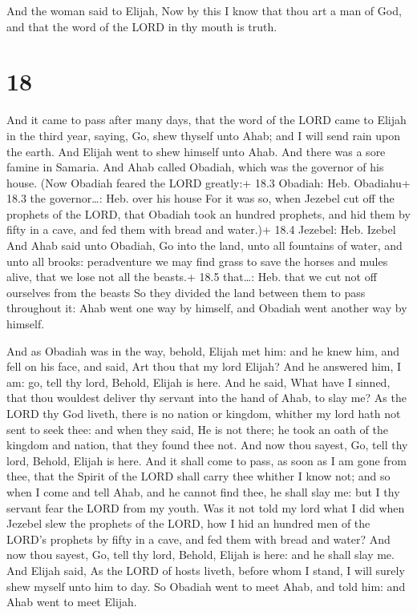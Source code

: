  And the woman said to Elijah, Now by this I know that
thou art a man of God, and that the word of the LORD in thy mouth is
truth.

\hypertarget{section-17}{%
\section{18}\label{section-17}}

 And it came to pass after many days, that the word of the
LORD came to Elijah in the third year, saying, Go, shew thyself unto
Ahab; and I will send rain upon the earth.  And Elijah went
to shew himself unto Ahab. And there was a sore famine in Samaria.
 And Ahab called Obadiah, which was the governor of his
house. (Now Obadiah feared the LORD greatly:+ 18.3 Obadiah: Heb.
Obadiahu+ 18.3 the governor\ldots: Heb. over his house  For
it was so, when Jezebel cut off the prophets of the LORD, that Obadiah
took an hundred prophets, and hid them by fifty in a cave, and fed them
with bread and water.)+ 18.4 Jezebel: Heb. Izebel  And Ahab
said unto Obadiah, Go into the land, unto all fountains of water, and
unto all brooks: peradventure we may find grass to save the horses and
mules alive, that we lose not all the beasts.+ 18.5 that\ldots: Heb.
that we cut not off ourselves from the beasts  So they
divided the land between them to pass throughout it: Ahab went one way
by himself, and Obadiah went another way by himself.

 And as Obadiah was in the way, behold, Elijah met him:
and he knew him, and fell on his face, and said, Art thou that my lord
Elijah?  And he answered him, I am: go, tell thy lord,
Behold, Elijah is here.  And he said, What have I sinned,
that thou wouldest deliver thy servant into the hand of Ahab, to slay
me?  As the LORD thy God liveth, there is no nation or
kingdom, whither my lord hath not sent to seek thee: and when they said,
He is not there; he took an oath of the kingdom and nation, that they
found thee not.  And now thou sayest, Go, tell thy lord,
Behold, Elijah is here.  And it shall come to pass, as soon
as I am gone from thee, that the Spirit of the LORD shall carry thee
whither I know not; and so when I come and tell Ahab, and he cannot find
thee, he shall slay me: but I thy servant fear the LORD from my youth.
 Was it not told my lord what I did when Jezebel slew the
prophets of the LORD, how I hid an hundred men of the LORD's prophets by
fifty in a cave, and fed them with bread and water?  And
now thou sayest, Go, tell thy lord, Behold, Elijah is here: and he shall
slay me.  And Elijah said, As the LORD of hosts liveth,
before whom I stand, I will surely shew myself unto him to day.
 So Obadiah went to meet Ahab, and told him: and Ahab went
to meet Elijah.

